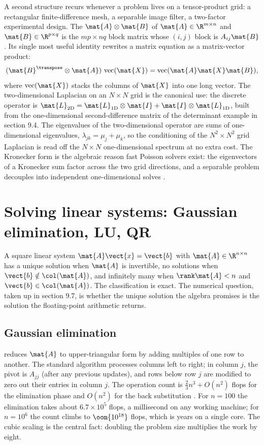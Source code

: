 A second structure recurs whenever a problem lives on a tensor-product
grid: a rectangular finite-difference mesh, a separable image filter,
a two-factor experimental design. The 
$\mat{A} \otimes \mat{B}$ of $\mat{A} \in \R^{m \times n}$ and
$\mat{B} \in \R^{p \times q}$ is the $mp \times nq$ block matrix
whose $(i,j)$ block is $A_{ij}\mat{B}$. Its single most useful
identity rewrites a matrix equation as a matrix-vector product:
\[
(\mat{B}^{\transpose} \otimes \mat{A})\,\operatorname{vec}(\mat{X}) =
\operatorname{vec}(\mat{A}\mat{X}\mat{B}),
\]
where $\operatorname{vec}(\mat{X})$ stacks the columns of $\mat{X}$ into one long
vector. The two-dimensional Laplacian on an $N \times N$ grid is the
canonical use: the discrete operator is $\mat{L}_{2\mathrm{D}} =
\mat{L}_{1\mathrm{D}} \otimes \mat{I} + \mat{I} \otimes
\mat{L}_{1\mathrm{D}}$, built from the one-dimensional second-difference
matrix of the determinant example in section 9.4. The eigenvalues of
the two-dimensional operator are sums of one-dimensional eigenvalues,
$\lambda_{jk} = \mu_{j} + \mu_{k}$, so the conditioning of the
$N^{2} \times N^{2}$ grid Laplacian is read off the $N \times N$
one-dimensional spectrum at no extra cost. The Kronecker form is the
algebraic reason fast Poisson solvers exist: the eigenvectors of a
Kronecker sum factor across the two grid directions, and a separable
problem decouples into independent one-dimensional solves
\cite[ch.~4]{text:v2ch09-golub-vanloan2013}.

\section{Solving linear systems: Gaussian elimination, LU, QR}

A square linear system $\mat{A}\vect{x} = \vect{b}$ with $\mat{A}
\in \R^{n \times n}$ has a unique solution when $\mat{A}$ is
invertible, no solutions when $\vect{b} \notin \col(\mat{A})$, and
infinitely many when $\rank \mat{A} < n$ and $\vect{b} \in
\col(\mat{A})$. The classification is exact. The numerical
question, taken up in section 9.7, is whether the unique solution
the algebra promises is the solution the floating-point arithmetic
returns.

\subsection{Gaussian elimination}

 reduces $\mat{A}$ to upper-triangular
form by adding multiples of one row to another. The standard
algorithm processes columns left to right; in column $j$, the
pivot is $A_{jj}$ (after any previous updates), and rows below row
$j$ are modified to zero out their entries in column $j$. The
operation count is $\tfrac{2}{3}n^{3} + O(n^{2})$ flops for the
elimination phase and $O(n^{2})$ for the back substitution
\cite[ch.~20]{text:trefethen-bau1997}. For $n = 100$ the elimination
takes about $6.7 \times 10^{5}$ flops, a millisecond on any working
machine; for $n = 10^{6}$ the count climbs to $\oom{10^{18}}$ flops,
which is years on a single core. The cubic scaling is the central
fact: doubling the problem size multiplies the work by eight.

